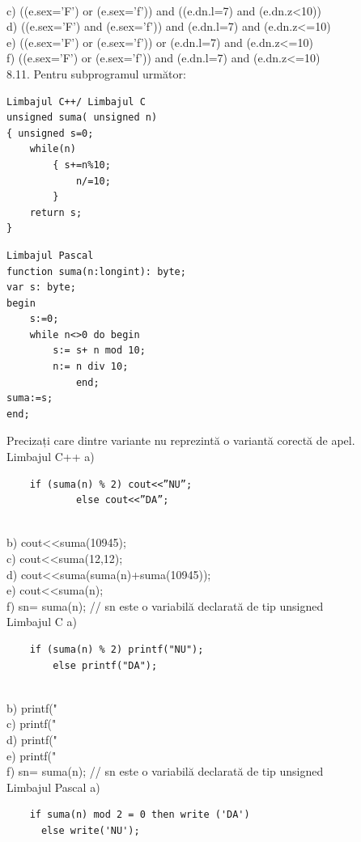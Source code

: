 \\
c) ((e.sex='F') or (e.sex='f')) and ((e.dn.l=7) and (e.dn.z<10))
\\ 
d) ((e.sex='F') and (e.sex='f')) and (e.dn.l=7) and (e.dn.z<=10)
\\
e) ((e.sex='F') or (e.sex='f')) or (e.dn.l=7) and (e.dn.z<=10)
\\
f) ((e.sex='F') or (e.sex='f')) and (e.dn.l=7) and (e.dn.z<=10)
\\
8.11. Pentru subprogramul următor:
\begin{verbatim}
Limbajul C++/ Limbajul C
unsigned suma( unsigned n)
{ unsigned s=0;
    while(n)
        { s+=n%10;
            n/=10;
        }
    return s;
}
\end{verbatim}
\begin{verbatim}
Limbajul Pascal
function suma(n:longint): byte;
var s: byte;
begin
    s:=0;
    while n<>0 do begin
        s:= s+ n mod 10;
        n:= n div 10;
            end;
suma:=s;
end;
\end{verbatim}
Precizați care dintre variante nu reprezintă o variantă corectă de apel.
\\
Limbajul C++
a) \begin{verbatim}
    if (suma(n) % 2) cout<<”NU”; 
            else cout<<”DA”;
\end{verbatim}
\\ 
b) cout<<suma(10945); 
\\
c) cout<<suma(12,12);
\\
d) cout<<suma(suma(n)+suma(10945));
\\
e) cout<<suma(n);
\\
f) sn= suma(n); // sn este o variabilă declarată de tip unsigned
\\
Limbajul C
a) \begin{verbatim}
    if (suma(n) % 2) printf("NU");
        else printf("DA");
\end{verbatim}
\\
b) printf("%
\\
c) printf("%
\\
d) printf("%
\\
e) printf("%
\\
f) sn= suma(n); // sn este o variabilă declarată de tip unsigned
\\
Limbajul Pascal
a) \begin{verbatim}
    if suma(n) mod 2 = 0 then write ('DA') 
      else write('NU');
\end{verbatim}
